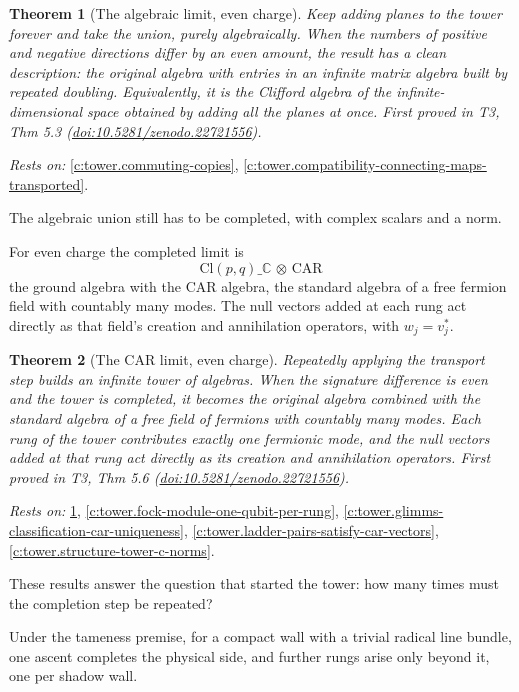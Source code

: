 \documentclass[11pt]{article}
\newtheorem{theorem}{Theorem}[section]
\theoremstyle{definition}
\theoremstyle{plain}
\providecommand{\C}{}\renewcommand{\C}{\mathbb{C}}
\providecommand{\CAR}{}\renewcommand{\CAR}{\mathrm{CAR}}
\providecommand{\Cl}{}\renewcommand{\Cl}{\mathrm{Cl}}
\begin{document}
\begin{theorem}[The algebraic limit, even charge]\label{c:tower.algebraic-limit-even-charge}
Keep adding planes to the tower forever and take the union, purely algebraically. When the numbers of positive and negative directions differ by an even amount, the result has a clean description: the original algebra with entries in an infinite matrix algebra built by repeated doubling. Equivalently, it is the Clifford algebra of the infinite-dimensional space obtained by adding all the planes at once.
\emph{First proved in} T3, Thm 5.3 (\href{https://doi.org/10.5281/zenodo.22721556}{doi:10.5281/zenodo.22721556}).
\end{theorem}
\noindent\emph{Rests on:} \ref{c:tower.commuting-copies}, \ref{c:tower.compatibility-connecting-maps-transported}.

The algebraic union still has to be completed, with complex scalars and a norm.

For even charge the completed limit is \[ \Cl(p,q)\_\C \,\otimes\, \CAR \] the ground algebra with the CAR algebra, the standard algebra of a free fermion field with countably many modes. The null vectors added at each rung act directly as that field's creation and annihilation operators, with $w_j = v_j^*$.

\begin{theorem}[The CAR limit, even charge]\label{c:tower.car-limit-even-charge}
Repeatedly applying the transport step builds an infinite tower of algebras. When the signature difference is even and the tower is completed, it becomes the original algebra combined with the standard algebra of a free field of fermions with countably many modes. Each rung of the tower contributes exactly one fermionic mode, and the null vectors added at that rung act directly as its creation and annihilation operators.
\emph{First proved in} T3, Thm 5.6 (\href{https://doi.org/10.5281/zenodo.22721556}{doi:10.5281/zenodo.22721556}).
\end{theorem}
\noindent\emph{Rests on:} \ref{c:tower.algebraic-limit-even-charge}, \ref{c:tower.fock-module-one-qubit-per-rung}, \ref{c:tower.glimms-classification-car-uniqueness}, \ref{c:tower.ladder-pairs-satisfy-car-vectors}, \ref{c:tower.structure-tower-c-norms}.

These results answer the question that started the tower: how many times must the completion step be repeated?

Under the tameness premise, for a compact wall with a trivial radical line bundle, one ascent completes the physical side, and further rungs arise only beyond it, one per shadow wall.
\end{document}
